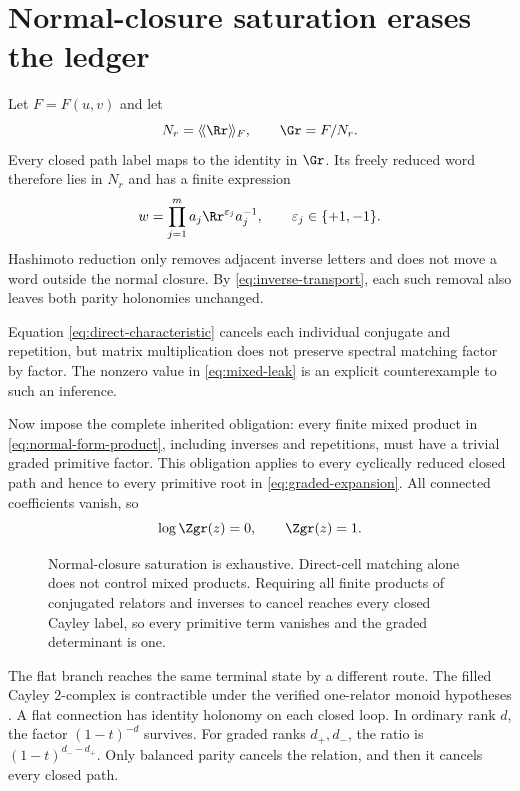 \section{Normal-closure saturation erases the ledger}
\label{sec:normal-closure}

Let $F=F(u,v)$ and let
\begin{equation}
  N_r=\langle\!\langle \Rr\rangle\!\rangle_F,
  \qquad \Gr=F/N_r.
  \label{eq:normal-closure}
\end{equation}
Every closed path label maps to the identity in $\Gr$.  Its freely reduced
word therefore lies in $N_r$ and has a finite expression
\begin{equation}
  w=\prod_{j=1}^{m}a_j\Rr^{\varepsilon_j}a_j^{-1},
  \qquad \varepsilon_j\in\{+1,-1\}.
  \label{eq:normal-form-product}
\end{equation}
Hashimoto reduction only removes adjacent inverse letters and does not move a
word outside the normal closure.  By \cref{eq:inverse-transport}, each such
removal also leaves both parity holonomies unchanged.

Equation \eqref{eq:direct-characteristic} cancels each individual conjugate
and repetition, but matrix multiplication does not preserve spectral matching
factor by factor.  The nonzero value in \cref{eq:mixed-leak} is an explicit
counterexample to such an inference.

Now impose the complete inherited obligation: every finite mixed product in
\cref{eq:normal-form-product}, including inverses and repetitions, must have a
trivial graded primitive factor.  This obligation applies to every cyclically
reduced closed path and hence to every primitive root in
\cref{eq:graded-expansion}.  All connected coefficients vanish, so
\begin{equation}
  \log\Zgr(z)=0,
  \qquad
  \Zgr(z)=1.
  \label{eq:empty-graded-ledger}
\end{equation}

\begin{figure}[H]
  \centering
  \resizebox{0.86\textwidth}{!}{}
  \caption{Normal-closure saturation is exhaustive.  Direct-cell matching
  alone does not control mixed products.  Requiring all finite products of
  conjugated relators and inverses to cancel reaches every closed Cayley label,
  so every primitive term vanishes and the graded determinant is one.}
  \label{fig:normal-closure}
\end{figure}

The flat branch reaches the same terminal state by a different route.  The
filled Cayley $2$-complex is contractible under the verified one-relator
monoid hypotheses \citep{GraySteinberg2022}.  A flat connection has identity
holonomy on each closed loop.  In ordinary rank $d$, the factor
$(1-t)^{-d}$ survives.  For graded ranks $d_+,d_-$, the ratio is
$(1-t)^{d_--d_+}$.  Only balanced parity cancels the relation, and then it
cancels every closed path.

